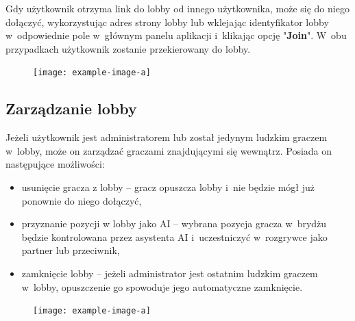 Gdy użytkownik otrzyma link do lobby od innego użytkownika, może się
do niego dołączyć, wykorzystując adres strony lobby lub wklejając
identyfikator lobby w~odpowiednie pole w~głównym panelu aplikacji
i~klikając opcję "\textbf{Join}". W~obu przypadkach użytkownik zostanie
przekierowany do lobby.

\begin{figure}[h]
  \centering
  \texttt{[image: example-image-a]}
  \caption{}
\end{figure}

\FloatBarrier

\subsection{Zarządzanie lobby}

Jeżeli użytkownik jest administratorem lub został jedynym
ludzkim graczem w~lobby, może on zarządzać graczami znajdującymi się
wewnątrz. Posiada on następujące możliwości:
\begin{itemize}
  \item usunięcie gracza z lobby -- gracz opuszcza lobby i~nie będzie
        mógł już ponownie do niego dołączyć,
  \item przyznanie pozycji w lobby jako AI -- wybrana pozycja
        gracza w~brydżu będzie kontrolowana przez asystenta AI
        i~uczestniczyć w~rozgrywce jako partner lub przeciwnik,
  \item zamknięcie lobby -- jeżeli administrator jest ostatnim ludzkim
        graczem w~lobby, opuszczenie go spowoduje jego automatyczne
        zamknięcie.

\end{itemize}

\begin{figure}[h]
  \centering
  \texttt{[image: example-image-a]}
  \caption{}
\end{figure}

\FloatBarrier



